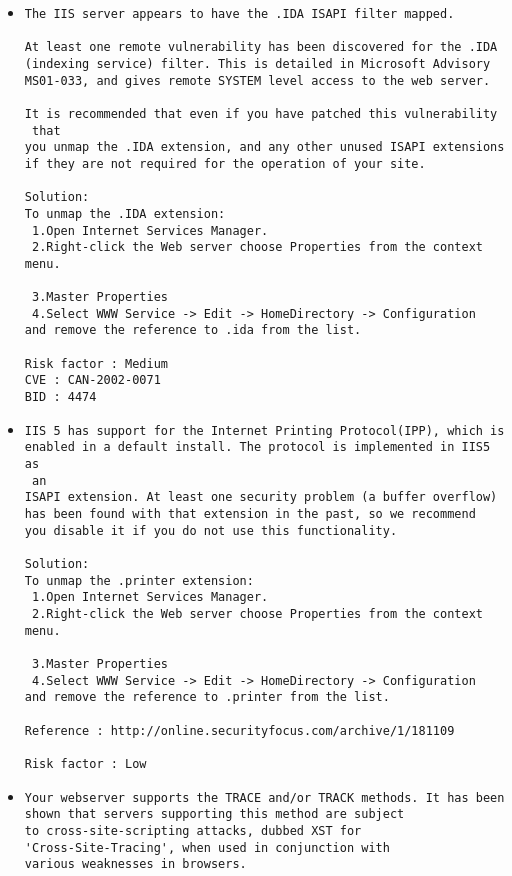 \documentclass{article}
\begin{document}
\begin{itemize}
\item \begin{verbatim}
The IIS server appears to have the .IDA ISAPI filter mapped.

At least one remote vulnerability has been discovered for the .IDA
(indexing service) filter. This is detailed in Microsoft Advisory
MS01-033, and gives remote SYSTEM level access to the web server. 

It is recommended that even if you have patched this vulnerability
 that
you unmap the .IDA extension, and any other unused ISAPI extensions
if they are not required for the operation of your site.

Solution: 
To unmap the .IDA extension:
 1.Open Internet Services Manager. 
 2.Right-click the Web server choose Properties from the context menu.
 
 3.Master Properties 
 4.Select WWW Service -> Edit -> HomeDirectory -> Configuration 
and remove the reference to .ida from the list.

Risk factor : Medium
CVE : CAN-2002-0071
BID : 4474
\end{verbatim}\item \begin{verbatim}
IIS 5 has support for the Internet Printing Protocol(IPP), which is 
enabled in a default install. The protocol is implemented in IIS5 as
 an 
ISAPI extension. At least one security problem (a buffer overflow)
has been found with that extension in the past, so we recommend
you disable it if you do not use this functionality.

Solution: 
To unmap the .printer extension:
 1.Open Internet Services Manager. 
 2.Right-click the Web server choose Properties from the context menu.
 
 3.Master Properties 
 4.Select WWW Service -> Edit -> HomeDirectory -> Configuration 
and remove the reference to .printer from the list.

Reference : http://online.securityfocus.com/archive/1/181109

Risk factor : Low
\end{verbatim}\item \begin{verbatim}
Your webserver supports the TRACE and/or TRACK methods. It has been
shown that servers supporting this method are subject
to cross-site-scripting attacks, dubbed XST for
'Cross-Site-Tracing', when used in conjunction with
various weaknesses in browsers.


\end{verbatim}
\end{itemize}
\end{document}
